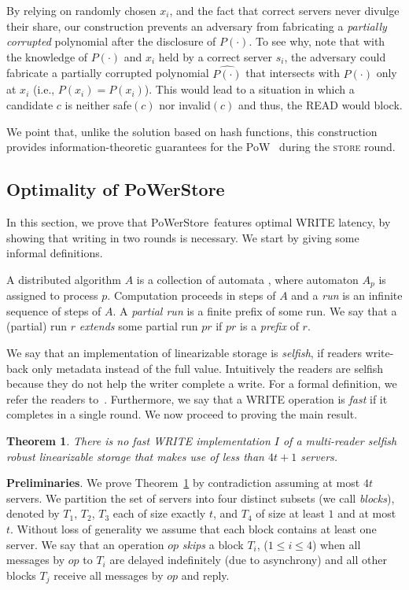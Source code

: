 \documentclass[10pt,conference,compsocconf]{IEEEtran}
\newcommand{\protocol}{PoWerStore}
\newtheorem{theo}[defn]{Theorem}
\begin{document}
By relying on randomly chosen $x_i$, and the fact that correct servers never divulge their share, our construction prevents an adversary from fabricating a \emph{partially corrupted} polynomial after the disclosure of $P(\cdot)$. To see why, note that with the knowledge of $P(\cdot)$ and $x_{i}$ held by a correct server $s_i$, the adversary could fabricate a partially corrupted polynomial $\hat{P(\cdot)}$ that intersects with $P(\cdot)$ only at $x_{i}$ (i.e., $P(x_i) = \hat{P(x_i)}$). This would lead to a situation in which a candidate $c$ is neither \textsf{safe}$(c)$ nor \textsf{invalid}$(c)$ and thus, the \textsc{READ} would block.

We point that, unlike the solution based on hash functions, this construction provides information-theoretic guarantees for the PoW~\cite{LCAA07,AAB07} during the \textsc{store} round.


\subsection{Optimality of \protocol{}}
In this section, we prove that \protocol\ features optimal \textsc{WRITE} latency, by showing that writing in two rounds is necessary. We start by giving some informal definitions.

A distributed algorithm $A$ is a collection of automata \cite{LT89}, where automaton $A_p$ is assigned to process $p$. Computation proceeds in steps of $A$ and a \emph{run} is an infinite sequence of steps of $A$. A \emph{partial run} is a finite prefix of some run. We say that a (partial) run $r$ \emph{extends} some partial run $pr$ if $pr$ is a \emph{prefix} of $r$.

We say that an implementation of linearizable storage is \emph{selfish}, if readers write-back only metadata instead of the full value. Intuitively the readers are selfish because they do not help the writer complete a write. For a formal definition, we refer the readers to~\cite{FL03}. Furthermore, we say that a \textsc{WRITE} operation is \emph{fast} if it completes in a single round. We now proceed to proving the main result. 



\begin{theo} \label{theo:lb}
There is no \emph{fast} \textsc{WRITE} implementation $I$ of a multi-reader \emph{selfish} robust linearizable storage that makes use of less than $4t+1$ servers.
\end{theo}
\noindent \textbf{Preliminaries}.
We prove Theorem~\ref{theo:lb} by contradiction assuming at most $4t$ servers. We partition the set of servers into four distinct subsets (we call \emph{blocks}), denoted by $T_1$, $T_2$, $T_3$ each of size exactly $t$, and $T_4$ of size at least $1$ and at most $t$. Without loss of generality we assume that each block contains at least one server. We say that an operation $op$ \emph{skips} a block $T_i$, ($1 \leq i \leq 4$) when all messages by $op$ to $T_i$ are delayed indefinitely (due to asynchrony) and all other blocks $T_j$ receive all messages by $op$ and reply.
\end{document}
